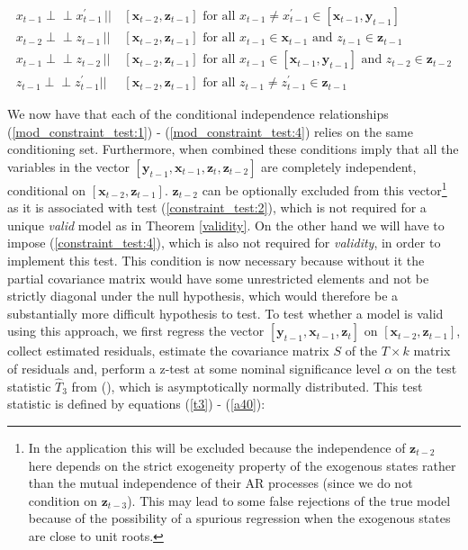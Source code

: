 \documentclass{article}
\def\indep{\perp \!\!\! \perp}
\begin{document}
\begin{align}
  x_{t-1} \indep x^{\prime}_{t-1} \,||\,& [\mathbf{x}_{t-2},\mathbf{z}_{t-1}] \text{ for all } x_{t-1} \neq x^{\prime}_{t-1} \in [\mathbf{x}_{t-1}, \mathbf{y}_{t-1}] \label{mod_constraint_test:1} \\
  x_{t-2} \indep z_{t-1} \,||\,& [\mathbf{x}_{t-2},\mathbf{z}_{t-1}] \text{ for all } x_{t-1} \in \mathbf{x}_{t-1} \text{ and } z_{t-1} \in \mathbf{z}_{t-1} \label{mod_constraint_test:3} \\
  x_{t-1} \indep z_{t-2} \,||\,& [\mathbf{x}_{t-2},\mathbf{z}_{t-1}] \text{ for all } x_{t-1} \in [\mathbf{x}_{t-1}, \mathbf{y}_{t-1}] \text{ and } z_{t-2} \in \mathbf{z}_{t-2} \label{mod_constraint_test:2} \\
  z_{t-1} \indep z^{\prime}_{t-1} || & [\mathbf{x}_{t-2},\mathbf{z}_{t-1}] \text{ for all } z_{t-1} \not = z^{\prime}_{t-1} \in \mathbf{z}_{t-1} \label{mod_constraint_test:4}
\end{align}

We now have that each of the conditional independence relationships (\ref{mod_constraint_test:1}) - (\ref{mod_constraint_test:4}) relies on the same conditioning set. Furthermore, when combined these conditions imply that all the variables in the vector $[\mathbf{y}_{t-1}, \mathbf{x}_{t-1}, \mathbf{z}_{t}, \mathbf{z}_{t-2}]$ are completely independent, conditional on $[\mathbf{x}_{t-2}, \mathbf{z}_{t-1}]$. $\mathbf{z}_{t-2}$ can be optionally excluded from this vector\footnote{In the application this will be excluded because the independence of $\mathbf{z}_{t-2}$ here depends on the strict exogeneity property of the exogenous states rather than the mutual independence of their AR processes (since we do not condition on $\mathbf{z}_{t-3}$). This may lead to some false rejections of the true model because of the possibility of a spurious regression when the exogenous states are close to unit roots.} as it is associated with test (\ref{constraint_test:2}), which is not required for a unique \textit{valid} model as in Theorem \ref{validity}. On the other hand we will have to impose (\ref{constraint_test:4}), which is also not required for \textit{validity}, in order to implement this test. This condition is now necessary because without it the partial covariance matrix would have some unrestricted elements and not be strictly diagonal under the null hypothesis, which would therefore be a substantially more difficult hypothesis to test. To test whether a model is valid using this approach, we first regress the vector $[\mathbf{y}_{t-1}, \mathbf{x}_{t-1}, \mathbf{z}_{t}]$ on $[\mathbf{x}_{t-2}, \mathbf{z}_{t-1}]$, collect estimated residuals, estimate the covariance matrix $S$ of the $T \times k$ matrix of residuals and, perform a z-test at some nominal significance level $\alpha$ on the test statistic $\hat{T}_3$ from \citeauthor{srivastava2005some} (\citeyear{srivastava2005some}), which is asymptotically normally distributed. This test statistic is defined by equations (\ref{t3}) - (\ref{a40}):
\end{document}
